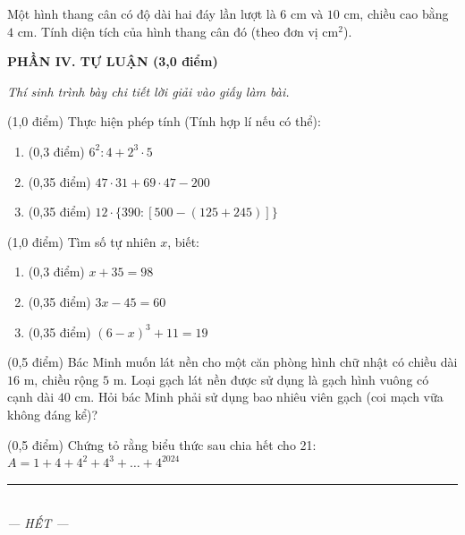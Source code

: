 \documentclass[12pt,a4paper]{article}
\begin{document}
\begin{ex}
Một hình thang cân có độ dài hai đáy lần lượt là $6\text{ cm}$ và $10\text{ cm}$, chiều cao bằng $4\text{ cm}$. Tính diện tích của hình thang cân đó (theo đơn vị $\text{cm}^2$). 
\end{ex}


\setcounter{ex}{0}
\noindent\textbf{\large PHẦN IV. TỰ LUẬN (3,0 điểm)}

\textit{Thí sinh trình bày chi tiết lời giải vào giấy làm bài.}

\vspace{1mm}
\begin{ex} (1,0 điểm)
Thực hiện phép tính (Tính hợp lí nếu có thể):
\begin{enumerate}[label=\textbf{\alph*)}, leftmargin=0.8cm, itemsep=2pt]
\item (0,3 điểm) $6^2 : 4 + 2^3 \cdot 5$
\item (0,35 điểm) $47 \cdot 31 + 69 \cdot 47 - 200$
\item (0,35 điểm) $12 \cdot \{390 : [500 - (125 + 245)]\}$
\end{enumerate}
\end{ex}
\vspace{1.5mm}

\begin{ex} (1,0 điểm)
Tìm số tự nhiên $x$, biết:
\begin{enumerate}[label=\textbf{\alph*)}, leftmargin=0.8cm, itemsep=2pt]
\item (0,3 điểm) $x + 35 = 98$
\item (0,35 điểm) $3x - 45 = 60$
\item (0,35 điểm) $(6 - x)^3 + 11 = 19$
\end{enumerate}
\end{ex}
\vspace{1.5mm}

\begin{ex} (0,5 điểm)
Bác Minh muốn lát nền cho một căn phòng hình chữ nhật có chiều dài $16\text{ m}$, chiều rộng $5\text{ m}$. Loại gạch lát nền được sử dụng là gạch hình vuông có cạnh dài $40\text{ cm}$. Hỏi bác Minh phải sử dụng bao nhiêu viên gạch (coi mạch vữa không đáng kể)?
\end{ex}
\vspace{1.5mm}

\begin{ex} (0,5 điểm)
Chứng tỏ rằng biểu thức sau chia hết cho 21:\\$A = 1 + 4 + 4^2 + 4^3 + \dots + 4^{2024}$
\end{ex}
\vspace{1.5mm}


\begin{center}
\rule{4cm}{0.4pt}\\
\textit{--- HẾT ---}
\end{center}
\end{document}
